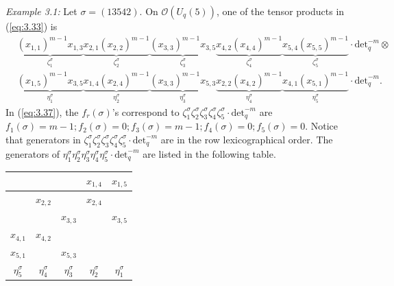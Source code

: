 \documentclass[table,a4paper,reqno]{amsart}
\numberwithin{equation}{section}
\theoremstyle{definition}
\begin{document}

\textit{Example 3.1:} Let $\sigma=(13542)$. On $\mathcal{O}(U_q(5))$, one of the tensor products in (\ref{eq:3.33}) is 
\begin{equation*}
\begin{split}
    &\underbrace{(x_{1,1})^{m-1}x_{1,3}}_{\zeta_1^\sigma}\underbrace{x_{2,1}(x_{2,2})^{m-1}}_{\zeta_2^\sigma}\underbrace{(x_{3,3})^{m-1}x_{3,5}}_{\zeta_3^\sigma}\underbrace{x_{4,2}(x_{4,4})^{m-1}}_{\zeta_4^\sigma}\underbrace{x_{5,4}(x_{5,5})^{m-1}}_{\zeta_5^\sigma}\cdot\text{det}_q^{-m}\otimes\\
        &\underbrace{(x_{1,5})^{m-1}x_{3,5}}_{\eta_1^\sigma}\underbrace{x_{1,4}(x_{2,4})^{m-1}}_{\eta_2^\sigma}\underbrace{(x_{3,3})^{m-1}x_{5,3}}_{\eta_3^\sigma}\underbrace{x_{2,2}(x_{4,2})^{m-1}}_{\eta_4^\sigma}\underbrace{x_{4,1}(x_{5,1})^{m-1}}_{\eta_5^\sigma}\cdot\text{det}_q^{-m}.
\end{split}
\end{equation*}
In (\ref{eq:3.37}), the $f_r(\sigma)$'s correspond to $\zeta_1^\sigma\zeta_2^\sigma\zeta_3^\sigma\zeta_4^\sigma\zeta_5^\sigma\cdot\text{det}_q^{-m}$ are $f_1(\sigma)=m-1; f_2(\sigma)=0; f_3(\sigma)=m-1; f_4(\sigma)=0; f_5(\sigma)=0$. Notice that generators in $\zeta_1^\sigma\zeta_2^\sigma\zeta_3^\sigma\zeta_4^\sigma\zeta_5^\sigma\cdot\text{det}_q^{-m}$ are in the row lexicographical order. The generators of $\eta_1^\sigma\eta_2^\sigma\eta_3^\sigma\eta_4^\sigma\eta_5^\sigma\cdot\text{det}_q^{-m}$ are listed in the following table.
\begin{center}
\begin{tabular}{|c|c|c|c|c|}
    \hline
        &  &  &\cellcolor{cyan!25} $x_{1,4}$ &\cellcolor{green!20} $x_{1,5}$ \\
    \hline     
        &\cellcolor{cyan!25} $x_{2,2}$ &  &\cellcolor{green!20} $x_{2,4}$ & \\
    \hline
        &  &\cellcolor{green!20} $x_{3,3}$ &  &\cellcolor{red!15}  $x_{3,5}$\\
    \hline
        \cellcolor{cyan!25}$x_{4,1}$&\cellcolor{green!20} $x_{4,2}$& & & \\
    \hline
        \cellcolor{green!20}$x_{5,1}$& &\cellcolor{red!15}$x_{5,3}$& &\\
    \hline
        \multicolumn{1}{c}{$\eta_5^\sigma$} & 
        \multicolumn{1}{c}{$\eta_4^\sigma$} & 
        \multicolumn{1}{c}{$\eta_3^\sigma$} &
        \multicolumn{1}{c}{$\eta_2^\sigma$} &
        \multicolumn{1}{c}{$\eta_1^\sigma$}
\end{tabular}
\end{center}
\end{document}
